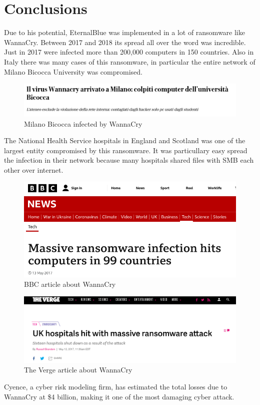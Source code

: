 \section{Conclusions}
Due to his potential, EternalBlue was implemented in a lot of ransomware like WannaCry. Between 2017
and 2018 its spread all over the word was incredible. Just in 2017 were infected more than 200,000 computers in 150 countries.
Also in Italy there was many cases of this ransomware, in particular the entire network of Milano Bicocca University was compromised.\\
\begin{figure}[ht!]
    \centering
      \includegraphics[scale=0.3]{images/bicocca.png}
      \caption{Milano Bicocca infected by WannaCry}
\end{figure}

\noindent The National Health Service hospitals in England and Scotland was one of the largest entity compromised by this ransomware. It was particullary 
easy spread the infection in their network because many hospitals shared files with SMB each other over internet.
\begin{figure}[ht!]
    \centering
      \includegraphics[scale=0.3]{images/bbc.png}
      \caption{BBC article about WannaCry}
\end{figure}

\begin{figure}[ht!]
    \centering
      \includegraphics[scale=0.3]{images/theverge.png}
      \caption{The Verge article about WannaCry}
\end{figure}

\noindent Cyence, a cyber risk modeling firm, has estimated the total losses due to WannaCry at \$4 billion, making it one
of the most damaging cyber attack.
